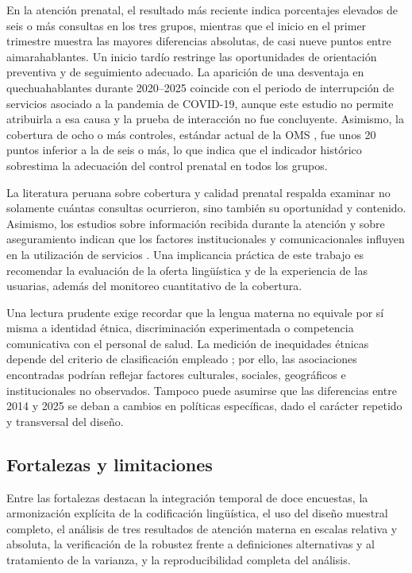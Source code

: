 \documentclass[
  spanish,
  letterpaper,
  conference]{IEEEtran}
\begin{document}
En la atención prenatal, el resultado más reciente indica porcentajes
elevados de seis o más consultas en los tres grupos, mientras que el
inicio en el primer trimestre muestra las mayores diferencias absolutas,
de casi nueve puntos entre aimarahablantes. Un inicio tardío restringe
las oportunidades de orientación preventiva y de seguimiento adecuado.
La aparición de una desventaja en quechuahablantes durante 2020--2025
coincide con el periodo de interrupción de servicios asociado a la
pandemia de COVID-19, aunque este estudio no permite atribuirla a esa
causa y la prueba de interacción no fue concluyente. Asimismo, la
cobertura de ocho o más controles, estándar actual de la OMS
\citep{oms2016}, fue unos 20 puntos inferior a la de seis o más, lo que
indica que el indicador histórico sobrestima la adecuación del control
prenatal en todos los grupos.

La literatura peruana sobre cobertura y calidad prenatal
\citep{enriquez2022} respalda examinar no solamente cuántas consultas
ocurrieron, sino también su oportunidad y contenido. Asimismo, los
estudios sobre información recibida durante la atención y sobre
aseguramiento indican que los factores institucionales y
comunicacionales influyen en la utilización de servicios
\citep{quispe2023, ramos2023, perezlu2018}. Una implicancia práctica de
este trabajo es recomendar la evaluación de la oferta lingüística y de
la experiencia de las usuarias, además del monitoreo cuantitativo de la
cobertura.

Una lectura prudente exige recordar que la lengua materna no equivale
por sí misma a identidad étnica, discriminación experimentada o
competencia comunicativa con el personal de salud. La medición de
inequidades étnicas depende del criterio de clasificación empleado
\citep{armenta2020}; por ello, las asociaciones encontradas podrían
reflejar factores culturales, sociales, geográficos e institucionales no
observados. Tampoco puede asumirse que las diferencias entre 2014 y 2025
se deban a cambios en políticas específicas, dado el carácter repetido y
transversal del diseño.

\subsection{Fortalezas y limitaciones}\label{fortalezas-y-limitaciones}

Entre las fortalezas destacan la integración temporal de doce encuestas,
la armonización explícita de la codificación lingüística, el uso del
diseño muestral completo, el análisis de tres resultados de atención
materna en escalas relativa y absoluta, la verificación de la robustez
frente a definiciones alternativas y al tratamiento de la varianza, y la
reproducibilidad completa del análisis.
\end{document}
